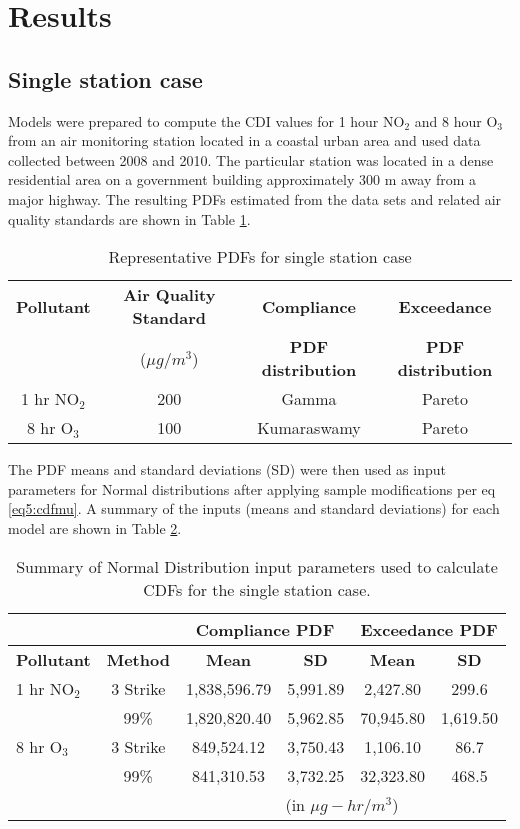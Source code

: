 \section{Results}

\subsection{Single station case}
Models were prepared to compute the CDI values for 1 hour NO$_{2}$ and 8 hour O$_{3}$ from an air monitoring station located in a coastal urban area and used data collected between 2008 and 2010.  The particular station was located in a dense residential area on a government building approximately 300 m away from a major highway. The resulting PDFs estimated from the data sets and related air quality standards are shown in Table \ref{tb5:singlePDF}.
%
\begin{table}[!htb]
\centering
\caption{Representative PDFs for single station case}
\label{tb5:singlePDF}
\begin{tabular}{@{}cccc@{}}
\toprule
\textbf{Pollutant} & \textbf{Air Quality Standard}  & \textbf{Compliance} & \textbf{Exceedance} \\ 
 &($\mu g/m^{3}$) &\textbf{PDF distribution} & \textbf{PDF distribution} \\ \midrule
1 hr NO$_{2}$ & 200 & Gamma & Pareto \\
8 hr O$_{3}$ & 100 & Kumaraswamy & Pareto \\ \bottomrule
\end{tabular}
\end{table}
%
The PDF means and standard deviations (SD) were then used as input parameters for Normal distributions after applying sample modifications per eq \ref{eq5:cdfmu}.  A summary of the inputs (means and standard deviations) for each model are shown in Table \ref{tb6:singleInputs}.
%
\begin{table}[!htb]
\centering
\caption{Summary of Normal Distribution input parameters used to calculate CDFs for the single station case.} 
\label{tb6:singleInputs}
\begin{tabular}{@{}lccccc@{}}
\toprule
\textbf{} & \textbf{} & \multicolumn{2}{c}{\textbf{Compliance PDF}} & \multicolumn{2}{c}{\textbf{Exceedance PDF}} \\ \midrule
\textbf{Pollutant} & \textbf{Method} & \textbf{Mean} & \textbf{SD} & \textbf{Mean} & \textbf{SD} \\
1 hr NO$_{2}$ & 3 Strike & 1,838,596.79 & 5,991.89 & 2,427.80 & 299.6 \\
 & 99\% & 1,820,820.40 & 5,962.85 & 70,945.80 & 1,619.50 \\
8 hr O$_{3}$ & 3 Strike & 849,524.12 & 3,750.43 & 1,106.10 & 86.7 \\
 & 99\% & 841,310.53 & 3,732.25 & 32,323.80 & 468.5 \\ \bottomrule
 &  & \multicolumn{4}{c}{(in $\mu g-hr/m^{3}$)} \\ 
\end{tabular}
\end{table}

